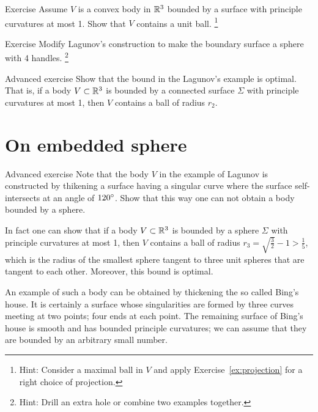 \begin{thm}{Exercise}\label{ex:convex-lagunov}
Assume $V$ is a convex body in $\mathbb{R}^3$ bounded by a surface with principle curvatures at most 1.
Show that $V$ contains a unit ball.%
\footnote{Hint: Consider a maximal ball in $V$ and apply Exercise~\ref{ex:projection} for a right choice of projection.}
\end{thm}





\begin{thm}{Exercise}
Modify Lagunov's construction to make the boundary surface a sphere with 4 handles.%
\footnote{Hint: Drill an extra hole or combine two examples together.}
\end{thm}



\begin{thm}{Advanced exercise}
Show that the bound in the Lagunov's example is optimal.
That is, if a body $V\subset \mathbb{R}^3$ is bounded by a connected surface  $\Sigma$ with principle curvatures at most 1, then $V$ contains a ball of radius $r_2$.
\end{thm}

\section{On embedded sphere}


\begin{thm}{Advanced exercise}
Note that the body $V$ in the example of Lagunov is constructed by thikening a surface having a singular curve where the surface self-intersects at an angle of $120\degree$.
Show that this way one can not obtain a body bounded by a sphere.
\end{thm}

In fact one can show that if a body $V\subset \mathbb{R}^3$ is bounded by a sphere $\Sigma$ with principle curvatures at most 1, then $V$ contains a ball of radius $r_3=\sqrt{\tfrac32}-1>\tfrac15$,
which is the radius of the smallest sphere tangent to three unit spheres that are tangent to each other.
Moreover, this bound is optimal.

An example of such a body can be obtained by thickening the so called Bing's house.
It is certainly a surface whose singularities are formed by three curves meeting at two points;
four ends at each point.
The remaining surface of Bing's house is smooth and has bounded principle curvatures;
we can assume that they are bounded by an arbitrary small number.

